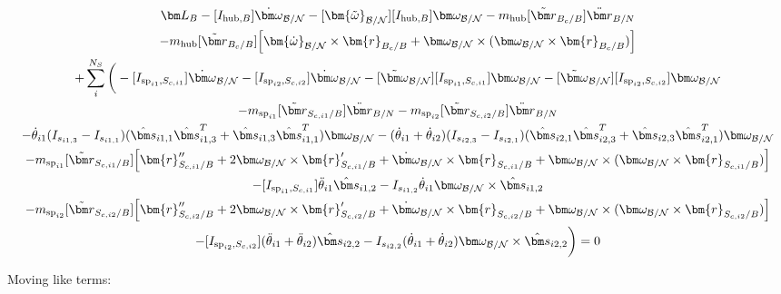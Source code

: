 \begin{multline}
	\bm L_B -[I_{\text{hub},B}] \dot{\bm\omega}_{\cal B/N}  -[\bm{\tilde{\omega}}_{\cal B/N}] [I_{\text{hub},B}] \bm\omega_{\cal B/N} - m_{\text{hub}} [\tilde{{\bm r}}_{B_c/B}] \ddot{\bm r}_{B/N} \\
	- m_{\text{hub}} [\tilde{{\bm r}}_{B_c/B}] \Big[\bm{\dot{\omega}}_{\cal B/N} \times \bm{r}_{B_c/B} + \bm\omega_{\cal B/N} \times (\bm\omega_{\cal B/N} \times \bm{r}_{B_c/B})\Big]\\
	+ \sum\limits_{i}^{N_S}\bigg(-[I_{\text{sp}_{i1},S_{c,i1}}] \dot{\bm \omega}_{\cal{B/N}} -[I_{\text{sp}_{i2},S_{c,i2}}] \dot{\bm \omega}_{\cal{B/N}} -[\tilde{\bm \omega}_{\cal{B/N}}] [I_{\text{sp}_{i1},S_{c,i1}}] \bm \omega_{\cal{B/N}}-[\tilde{\bm \omega}_{\cal{B/N}}] [I_{\text{sp}_{i2},S_{c,i2}}] \bm \omega_{\cal{B/N}}\\
	- m_{\text{sp}_{i1}} [\tilde{{\bm r}}_{S_{c,i1}/B}] \ddot{\bm r}_{B/N}- m_{\text{sp}_{i2}} [\tilde{{\bm r}}_{S_{c,i2}/B}] \ddot{\bm r}_{B/N}\\
	-\dot{\theta}_{i1} (I_{s_{i1,3}} - I_{s_{i1,1}})( \hat{\bm s}_{i1,1} \hat{\bm s}_{i1,3}^T + \hat{\bm s}_{i1,3} \hat{\bm s}_{i1,1}^T) \bm \omega_{\cal{B/N}} -(\dot{\theta}_{i1}  + \dot{\theta}_{i2})(I_{s_{i2,3}} - I_{s_{i2,1}}) (\hat{\bm s}_{i2,1} \hat{\bm s}_{i2,3}^T + \hat{\bm s}_{i2,3} \hat{\bm s}_{i2,1}^T) \bm \omega_{\cal{B/N}} \\
	- m_{\text{sp}_{i1}} [\tilde{{\bm r}}_{S_{c,i1}/B}] \Big[\bm{r}''_{S_{c,i1}/B} + 2 \bm\omega_{\cal B/N} \times \bm{r}'_{S_{c,i1}/B} +  \dot{\bm\omega}_{\cal B/N} \times \bm{r}_{S_{c,i1}/B} + \bm\omega_{\cal B/N} \times (\bm\omega_{\cal B/N} \times \bm{r}_{S_{c,i1}/B})\Big]\\
	-[I_{\text{sp}_{i1},S_{c,i1}}] \ddot{\theta}_{i1} \hat{\bm s}_{i1,2}
	-I_{s_{i1,2}} \dot{\theta}_{i1} \bm \omega_{\cal{B/N}} \times \hat{\bm s}_{i1,2}\\
	- m_{\text{sp}_{i2}} [\tilde{{\bm r}}_{S_{c,i2}/B}] \Big[ \bm{r}''_{S_{c,i2}/B} + 2 \bm\omega_{\cal B/N} \times \bm{r}'_{S_{c,i2}/B} +  \dot{\bm\omega}_{\cal B/N} \times \bm{r}_{S_{c,i2}/B} + \bm\omega_{\cal B/N} \times (\bm\omega_{\cal B/N} \times \bm{r}_{S_{c,i2}/B})\Big]\\
	-[I_{\text{sp}_{i2},S_{c,i2}}] (\ddot{\theta}_{i1}  + \ddot{\theta}_{i2})\hat{\bm s}_{i2,2}
	-I_{s_{i2,2}}  (\dot{\theta}_{i1}  + \dot{\theta}_{i2}) \bm \omega_{\cal{B/N}} \times \hat{\bm s}_{i2,2} \bigg) = 0
\end{multline}

Moving like terms:

